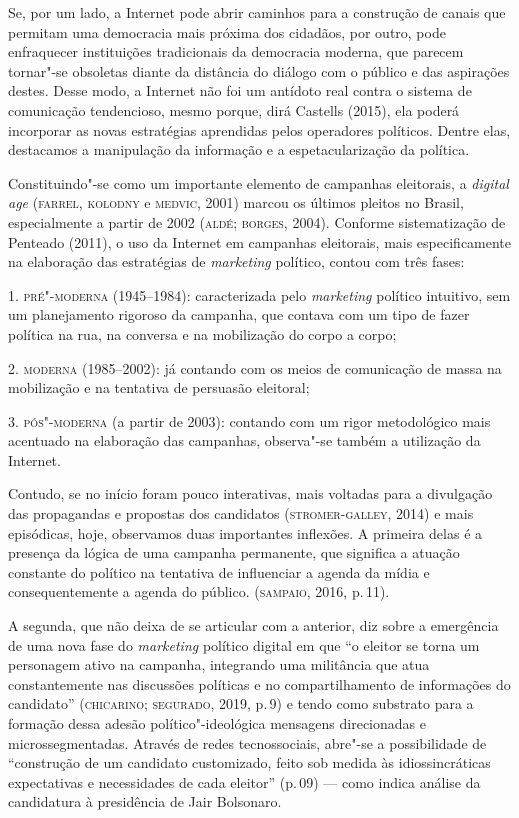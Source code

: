 Se, por um lado, a Internet pode abrir caminhos para a construção de
canais que permitam uma democracia mais próxima dos cidadãos, por outro,
pode enfraquecer instituições tradicionais da democracia moderna, que
parecem tornar"-se obsoletas diante da distância do diálogo com o público
e das aspirações destes. Desse modo, a Internet não foi um antídoto real
contra o sistema de comunicação tendencioso, mesmo porque, dirá Castells
(2015), ela poderá incorporar as novas estratégias aprendidas pelos
operadores políticos. Dentre elas, destacamos a manipulação da
informação e a espetacularização da política.

Constituindo"-se como um importante elemento de campanhas eleitorais, a
\emph{digital age} (\textsc{farrel}, \textsc{kolodny} e \textsc{medvic}, 2001) marcou os últimos
pleitos no Brasil, especialmente a partir de 2002 (\textsc{aldé}; \textsc{borges}, 2004).
Conforme sistematização de Penteado (2011), o uso da Internet em
campanhas eleitorais, mais especificamente na elaboração das estratégias
de \emph{marketing} político, contou com três fases:

1. \textsc{pré"-moderna} (1945--1984): caracterizada pelo \emph{marketing} político
intuitivo, sem um planejamento rigoroso da campanha, que contava com um
tipo de fazer política na rua, na conversa e na mobilização do corpo a
corpo;

2. \textsc{moderna} (1985--2002): já contando com os meios de comunicação de massa
na mobilização e na tentativa de persuasão eleitoral;

3. \textsc{pós"-moderna} (a partir de 2003): contando com um rigor metodológico
mais acentuado na elaboração das campanhas, observa"-se também a
utilização da Internet.

Contudo, se no início foram pouco interativas, mais voltadas para a
divulgação das propagandas e propostas dos candidatos (\textsc{stromer}-\textsc{galley},
2014) e mais episódicas, hoje, observamos duas importantes inflexões. A
primeira delas é a presença da lógica de uma campanha permanente, que
significa a atuação constante do político na tentativa de influenciar a
agenda da mídia e consequentemente a agenda do público. (\textsc{sampaio}, 2016,
p.\,11).

A segunda, que não deixa de se articular com a anterior, diz sobre a
emergência de uma nova fase do \emph{marketing} político digital em que
``o eleitor se torna um personagem ativo na campanha, integrando uma
militância que atua constantemente nas discussões políticas e no
compartilhamento de informações do candidato'' (\textsc{chicarino}; \textsc{segurado},
2019, p.\,9) e tendo como substrato para a formação dessa adesão
político"-ideológica mensagens direcionadas e microssegmentadas. Através
de redes tecnossociais, abre"-se a possibilidade de ``construção de um
candidato customizado, feito sob medida às idiossincráticas expectativas
e necessidades de cada eleitor'' (p.\,09) --- como indica análise da
candidatura à presidência de Jair Bolsonaro.

